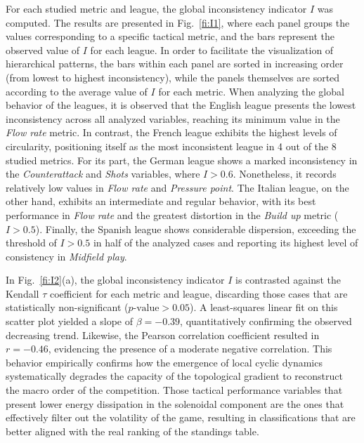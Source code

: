 \documentclass[preprint,12pt]{elsarticle}
\begin{document}
{For each studied metric and league, the global inconsistency indicator $I$ was computed. The results are presented in Fig.~\ref{fi:I1}, where each panel groups the values corresponding to a specific tactical metric, and the bars represent the observed value of $I$ for each league. In order to facilitate the visualization of hierarchical patterns, the bars within each panel are sorted in increasing order (from lowest to highest inconsistency), while the panels themselves are sorted according to the average value of $I$ for each metric.
%
When analyzing the global behavior of the leagues, it is observed that the English league presents the lowest inconsistency across all analyzed variables, reaching its minimum value in the {\it Flow rate} metric. In contrast, the French league exhibits the highest levels of circularity, positioning itself as the most inconsistent league in 4 out of the 8 studied metrics. For its part, the German league shows a marked inconsistency in the {\it Counterattack} and {\it Shots} variables, where $I > 0.6$. Nonetheless, it records relatively low values in {\it Flow rate} and {\it Pressure point}. The Italian league, on the other hand, exhibits an intermediate and regular behavior, with its best performance in {\it Flow rate} and the greatest distortion in the {\it Build up} metric ($I > 0.5$). Finally, the Spanish league shows considerable dispersion, exceeding the threshold of $I > 0.5$ in half of the analyzed cases and reporting its highest level of consistency in {\it Midfield play}.

In Fig.~\ref{fi:I2}(a), the global inconsistency indicator $I$ is contrasted against the Kendall $\tau$ coefficient for each metric and league, discarding those cases that are statistically non-significant ($p\text{-value} > 0.05$). A least-squares linear fit on this scatter plot yielded a slope of $\beta = -0.39$, quantitatively confirming the observed decreasing trend. 
Likewise, the Pearson correlation coefficient resulted in $r = -0.46$, evidencing the presence of a moderate negative correlation. This behavior empirically confirms how the emergence of local cyclic dynamics systematically degrades the capacity of the topological gradient to reconstruct the macro order of the competition. Those tactical performance variables that present lower energy dissipation in the solenoidal component are the ones that effectively filter out the volatility of the game, resulting in classifications that are better aligned with the real ranking of the standings table.

}
\end{document}
